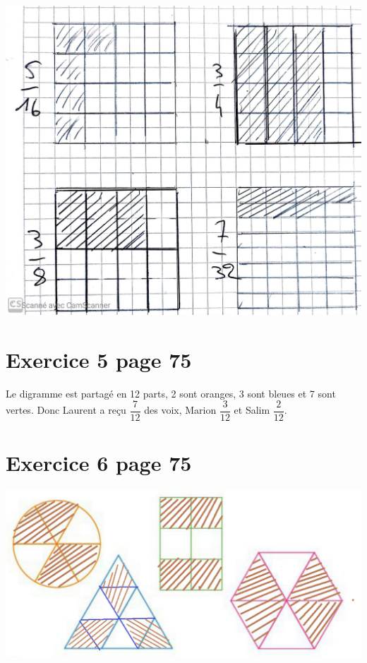 \documentclass[12pt,a4paper]{article}
\begin{document}
\begin{center}
	\includegraphics[scale=0.18]{img/ex3}
\end{center}
%
%
%
%
%


\section{Exercice 5 page 75}

Le digramme est partagé en 12 parts, 2 sont oranges, 3 sont bleues et 7 sont vertes. 
Donc Laurent a reçu $\dfrac{7}{12}$ des voix, Marion $\dfrac{3}{12}$ et Salim $\dfrac{2}{12}$.

\section{Exercice 6 page 75}

\includegraphics[scale=0.5]{img/ex6}
\end{document}
